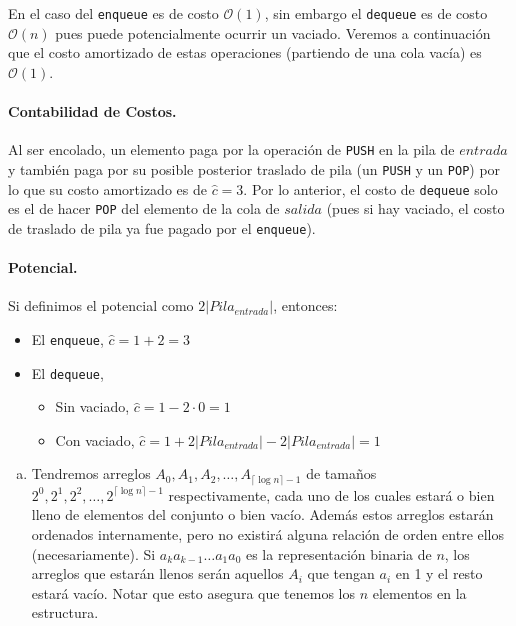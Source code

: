 \documentclass[dcc,uchile]{fcfmcourse}
\theoremstyle{plain}
\theoremstyle{definition}
\begin{document}
\begin{problems}
En el caso del \texttt{enqueue} es de costo $\mathcal{O}(1)$, sin embargo el \texttt{dequeue} es de costo $\mathcal{O}(n)$ pues puede potencialmente ocurrir un vaciado. Veremos a continuación que el costo amortizado de estas operaciones (partiendo de una cola vacía) es $\mathcal{O}(1)$.

\paragraph{Contabilidad de Costos.} Al ser encolado, un elemento paga por la operación de \texttt{PUSH} en la pila de $entrada$ y también paga por su posible posterior traslado de pila (un \texttt{PUSH} y un \texttt{POP}) por lo que su costo amortizado es de $\hat{c} = 3$. Por lo anterior, el costo de \texttt{dequeue} solo es el de hacer \texttt{POP} del elemento de la cola de $salida$ (pues si hay vaciado, el costo de traslado de pila ya fue pagado por el \texttt{enqueue}).

\paragraph{Potencial.} 
Si definimos el potencial como $2|Pila_{entrada}|$, entonces:
\begin{itemize}
    \item El \texttt{enqueue}, $\hat{c} = 1 + 2 = 3$
    \item El \texttt{dequeue},
    \begin{itemize}
        \item Sin vaciado, $\hat{c} = 1 - 2\cdot 0 = 1$
        \item Con vaciado, $\hat{c} = 1 + 2|Pila_{entrada}| - 2|Pila_{entrada}| = 1$
    \end{itemize} 
\end{itemize}
\problem
\begin{enumerate}[a)]
    \item Tendremos arreglos $A_{0}, A_{1}, A_{2}, \ldots, A_{\lceil \log n \rceil-1}$  de tamaños $2^0, 2^1, 2^2, \ldots, 2^{\lceil \log n \rceil-1}$ respectivamente, cada uno de los cuales estará o bien lleno de elementos del conjunto o bien vacío. Además estos arreglos estarán ordenados internamente, pero no existirá alguna relación de orden entre ellos (necesariamente). Si $a_{k}a_{k-1}\ldots a_{1}a_{0}$ es la representación binaria de $n$, los arreglos que estarán llenos serán aquellos $A_i$ que tengan $a_{i}$ en 1 y el resto estará vacío. Notar que esto asegura que tenemos los $n$ elementos en la estructura.\\
    

\end{enumerate}
\end{problems}
\end{document}
